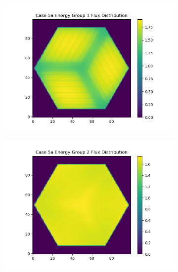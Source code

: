 \documentclass[letterpaper,11pt]{report}
\begin{document}
        \begin{figure}[H]
          \centering
            \begin{subfigure}{.33\textwidth}
              \centering
              \includegraphics[width=1.1\linewidth]{../../phase1a/case5a/analysis_output/p1a_5a_e_eg1.png}
              \caption{}
            \end{subfigure}%
            \begin{subfigure}{.33\textwidth}
              \centering
              \includegraphics[width=1.1\linewidth]{../../phase1a/case5a/analysis_output/p1a_5a_e_eg2.png}
              \caption{}
            \end{subfigure}
            \begin{subfigure}{.33\textwidth}

\end{subfigure}
\end{figure}
\end{document}
